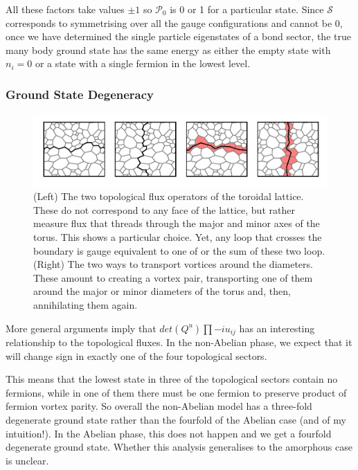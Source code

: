 All these factors take values \(\pm 1\) so \(\mathcal{P}_0\) is 0 or 1 for a particular state. Since \(\mathcal{S}\) corresponds to symmetrising over all the gauge configurations and cannot be 0, once we have determined the single particle eigenstates of a bond sector, the true many body ground state has the same energy as either the empty state with \(n_i = 0\) or a state with a single fermion in the lowest level.

\hypertarget{ground-state-degeneracy}{%
\subsubsection{Ground State Degeneracy}\label{ground-state-degeneracy}}

\begin{figure}
\hypertarget{fig:loops_and_dual_loops}{%
\centering
\includegraphics[width=1\textwidth,height=\textheight]{figure_code/amk_chapter/loops_and_dual_loops/loops_and_dual_loops}
\caption[Topological Loops and Dual Loops]{(Left) The two topological flux operators of the toroidal
lattice. These do not correspond to any face of the lattice, but rather
measure flux that threads through the major and minor axes of the torus.
This shows a particular choice. Yet, any loop that crosses the boundary
is gauge equivalent to one of or the sum of these two loop. (Right) The
two ways to transport vortices around the diameters. These amount to
creating a vortex pair, transporting one of them around the major or
minor diameters of the torus and, then, annihilating them
again.}\label{fig:loops_and_dual_loops}
}
\end{figure}

More general arguments\autocite{chungExplicitMonodromyMoore2007,oshikawaTopologicalDegeneracyNonAbelian2007} imply that \(det(Q^u) \prod -i u_{ij}\) has an interesting relationship to the topological fluxes. In the non-Abelian phase, we expect that it will change sign in exactly one of the four topological sectors.

This means that the lowest state in three of the topological sectors contain no fermions, while in one of them there must be one fermion to preserve product of fermion vortex parity. So overall the non-Abelian model has a three-fold degenerate ground state rather than the fourfold of the Abelian case (and of my intuition!). In the Abelian phase, this does not happen and we get a fourfold degenerate ground state. Whether this analysis generalises to the amorphous case is unclear.

